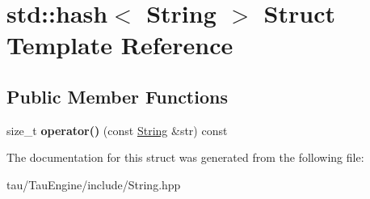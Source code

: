 \hypertarget{structstd_1_1hash_3_01_string_01_4}{}\section{std\+:\+:hash$<$ String $>$ Struct Template Reference}
\label{structstd_1_1hash_3_01_string_01_4}
\subsection*{Public Member Functions}
\begin{DoxyCompactItemize}
\item 
\mbox{\label{structstd_1_1hash_3_01_string_01_4_a05ff12c8d95ebf32c6eaf61c688d0bce}} 
size\+\_\+t {\bfseries operator()} (const \mbox{\hyperlink{class_string}{String}} \&str) const
\end{DoxyCompactItemize}


The documentation for this struct was generated from the following file\+:\begin{DoxyCompactItemize}
\item 
tau/\+Tau\+Engine/include/String.\+hpp\end{DoxyCompactItemize}

